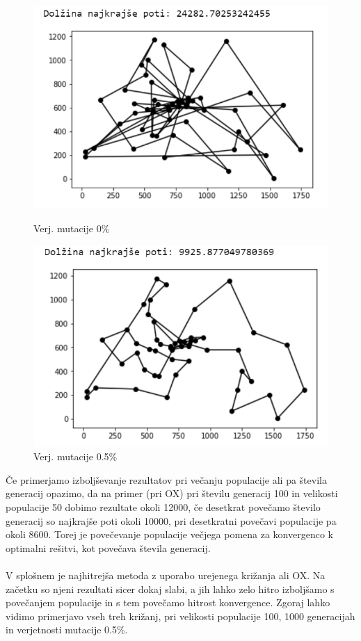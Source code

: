 \documentclass[12pt,a4paper]{amsart}
\theoremstyle{definition} %
\theoremstyle{plain} %
\begin{document}
\begin{figure}[h!]
\begin{minipage}[t]{0.48\textwidth}
\includegraphics[width=\linewidth,keepaspectratio=true]{primer-mut1}
\caption{Verj. mutacije 0\%}
\label{mut1}
\end{minipage}
\hspace*{\fill} %
\begin{minipage}[t]{0.48\textwidth}
\includegraphics[width=\linewidth,keepaspectratio=true]{primer-mut2}
\caption{Verj. mutacije 0.5\%}
\label{mut2}
\end{minipage}
\end{figure}
\newpage
Če primerjamo izboljševanje rezultatov pri večanju populacije ali pa števila generacij opazimo, da na primer (pri OX) pri številu generacij 100 in velikosti populacije 50 dobimo rezultate okoli 12000, če desetkrat povečamo število generacij so najkrajše poti okoli 10000, pri desetkratni povečavi populacije pa okoli 8600. Torej je povečevanje populacije večjega pomena za konvergenco k optimalni rešitvi, kot povečava števila generacij.
\\
\\
 V splošnem je najhitrejša metoda z uporabo urejenega križanja ali OX. Na začetku so njeni rezultati sicer dokaj slabi, a jih lahko zelo hitro izboljšamo s povečanjem populacije in s tem povečamo hitrost konvergence. 
Zgoraj lahko vidimo primerjavo vseh treh križanj, pri velikosti populacije 100, 1000 generacijah in verjetnosti mutacije 0.5\%.
\end{document}

